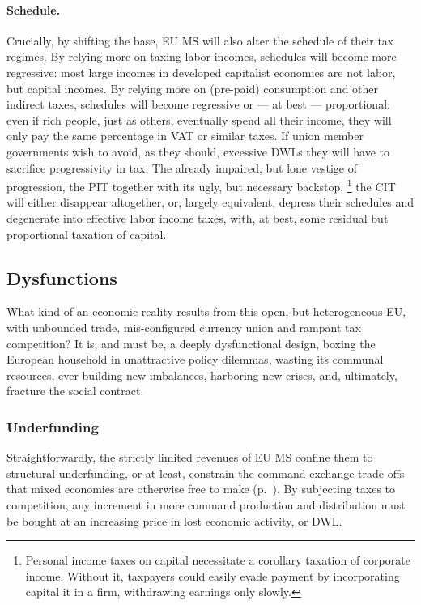 \paragraph{Schedule.}
Crucially, by shifting the base, \gls{EU} \gls{MS} will also alter the schedule of their tax regimes.
By relying more on taxing labor incomes, schedules will become more regressive:
most large incomes in developed capitalist economies are not labor, but capital incomes.
By relying more on (pre-paid) consumption and other indirect taxes, schedules will become regressive or --- at best --- proportional:
even if rich people, just as others, eventually spend all their income, they will only pay the same percentage in \gls{VAT} or similar taxes.
If union member governments wish to avoid, as they should, excessive \glspl{DWL} they will have to sacrifice progressivity in tax.
The already impaired, but lone vestige of progression, the \gls{PIT} together with its ugly, but necessary backstop,
\footnote{
	Personal income taxes on capital necessitate a corollary taxation of corporate income.
	Without it, taxpayers could easily evade payment by incorporating capital it in a firm, withdrawing earnings only slowly.
}
the \gls{CIT} will either disappear altogether, or, largely equivalent, depress their schedules and degenerate into effective labor income taxes, with, at best, some residual but proportional taxation of capital.

\subsection{Dysfunctions}
	\label{sec:defunct}
What kind of an economic reality results from this open, but heterogeneous \gls{EU}, with unbounded trade, mis-configured currency union and rampant tax competition?
It is, and must be, a deeply dysfunctional design, boxing the European household in unattractive policy dilemmas, wasting its communal resources, ever building new imbalances, harboring new crises, and, ultimately, fracture the social contract.

\subsubsection{Underfunding}
	\label{sec:public-squalor}
Straightforwardly, the strictly limited revenues of \gls{EU} \gls{MS} confine them to structural underfunding, or at least, constrain the command-exchange \hyperref[sec:trade-offs]{trade-offs} that mixed economies are otherwise free to make (p.~\pageref{sec:trade-offs}).
By subjecting taxes to competition, any increment in more command production and distribution must be bought at an increasing price in lost economic activity, or \gls{DWL}.

